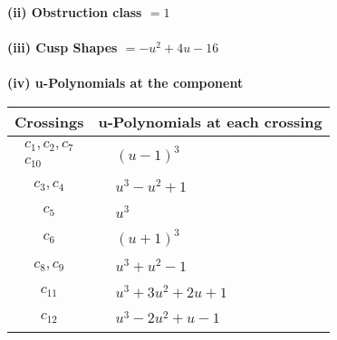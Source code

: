\documentclass[1p]{elsarticle_modified}
\theoremstyle{definition}
\begin{document}
\flushleft \textbf{(ii) Obstruction class $= 1$}\\~\\
\flushleft \textbf{(iii) Cusp Shapes $= - u^2+4 u-16$}\\~\\
\newpage\renewcommand{\arraystretch}{1}
\flushleft \textbf{(iv) u-Polynomials at the component}\newline \\
\begin{tabular}{m{50pt}|m{274pt}}
Crossings & \hspace{64pt}u-Polynomials at each crossing \\
\hline $$\begin{aligned}c_{1},c_{2},c_{7}\\c_{10}\end{aligned}$$&$\begin{aligned}
&(u-1)^3
\end{aligned}$\\
\hline $$\begin{aligned}c_{3},c_{4}\end{aligned}$$&$\begin{aligned}
&u^3- u^2+1
\end{aligned}$\\
\hline $$\begin{aligned}c_{5}\end{aligned}$$&$\begin{aligned}
&u^3
\end{aligned}$\\
\hline $$\begin{aligned}c_{6}\end{aligned}$$&$\begin{aligned}
&(u+1)^3
\end{aligned}$\\
\hline $$\begin{aligned}c_{8},c_{9}\end{aligned}$$&$\begin{aligned}
&u^3+u^2-1
\end{aligned}$\\
\hline $$\begin{aligned}c_{11}\end{aligned}$$&$\begin{aligned}
&u^3+3 u^2+2 u+1
\end{aligned}$\\
\hline $$\begin{aligned}c_{12}\end{aligned}$$&$\begin{aligned}
&u^3-2 u^2+u-1
\end{aligned}$\\
\hline
\end{tabular}\\~\\
\end{document}
